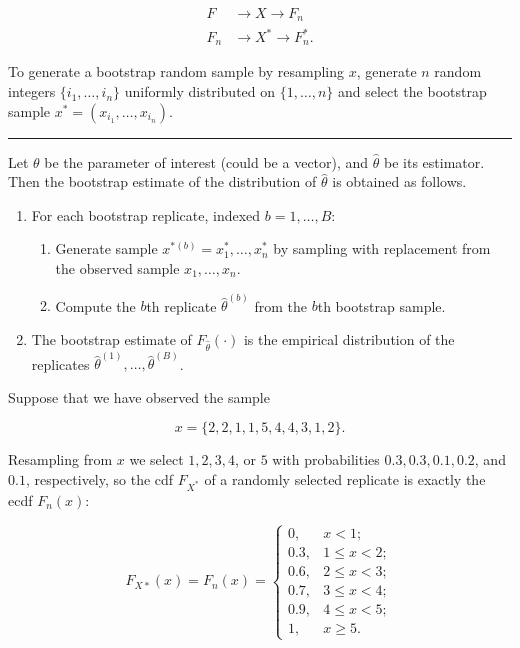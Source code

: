 \documentclass[
  letterpaper,
  DIV=11,
  numbers=noendperiod]{scrreprt}
\providecommand{\tightlist}{%
  \setlength{\itemsep}{0pt}\setlength{\parskip}{0pt}}
\begin{document}
\[
\begin{aligned}
F & \rightarrow X \rightarrow F_n \\
F_n & \rightarrow X^* \rightarrow F_n^* .
\end{aligned}
\]

To generate a bootstrap random sample by resampling \(x\), generate
\(n\) random integers \(\{i_1,\dots, i_n\}\) uniformly distributed on
\(\{1,\dots , n\}\) and select the bootstrap sample
\(x^\ast = (x_{i_1} ,\dots , x_{i_n} )\).

\begin{center}\rule{0.5\linewidth}{0.5pt}\end{center}

Let \(\theta\) be the parameter of interest (could be a vector), and
\(\hat{\theta}\) be its estimator. Then the bootstrap estimate of the
distribution of \(\hat{\theta}\) is obtained as follows.

\begin{enumerate}
\def\labelenumi{\arabic{enumi}.}
\tightlist
\item
  For each bootstrap replicate, indexed \(b = 1, \dots, B\):

  \begin{enumerate}
  \def\labelenumii{(\alph{enumii})}
  \tightlist
  \item
    Generate sample \(x^{\ast (b)} = x_1^\ast,\dots,x_n^\ast\) by
    sampling with replacement from the observed sample
    \(x_1,\dots,x_n\).
  \item
    Compute the \(b\)th replicate \(\hat \theta^{(b)}\) from the \(b\)th
    bootstrap sample.
  \end{enumerate}
\item
  The bootstrap estimate of \(F_{\hat \theta}(\cdot)\) is the empirical
  distribution of the replicates
  \(\hat \theta^{(1)},\dots ,\hat \theta^{(B)}\).
\end{enumerate}

Suppose that we have observed the sample

\[x = \{2, 2, 1, 1, 5, 4, 4, 3, 1, 2\}.\]

Resampling from \(x\) we select \(1, 2, 3, 4\), or \(5\) with
probabilities \(0.3, 0.3, 0.1, 0.2\), and \(0.1\), respectively, so the
cdf \(F_{X^\ast}\) of a randomly selected replicate is exactly the ecdf
\(F_n(x)\):

\[
F_{X *}(x)=F_n(x)= \begin{cases}0, & x<1 ; \\ 0.3, & 1 \leq x<2 ; \\ 0.6, & 2 \leq x<3 ; \\ 0.7, & 3 \leq x<4 ; \\ 0.9, & 4 \leq x<5 ; \\ 1, & x \geq 5 .\end{cases}
\]
\end{document}
